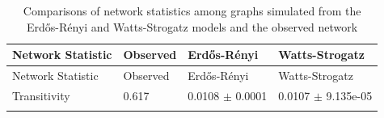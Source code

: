 \documentclass[12pt,twoside]{amherstthesis}
\begin{document}
  \begin{longtable}[]{@{}llll@{}}
  \caption{Comparisons of network statistics among graphs simulated from
  the Erdős-Rényi and Watts-Strogatz models and the observed network
  \label{tab:erwsdescstats}}\tabularnewline
  \toprule
  \begin{minipage}[b]{0.27\columnwidth}\raggedright\strut
  Network Statistic\strut
  \end{minipage} & \begin{minipage}[b]{0.11\columnwidth}\raggedright\strut
  Observed\strut
  \end{minipage} & \begin{minipage}[b]{0.25\columnwidth}\raggedright\strut
  Erdős-Rényi\strut
  \end{minipage} & \begin{minipage}[b]{0.25\columnwidth}\raggedright\strut
  Watts-Strogatz\strut
  \end{minipage}\tabularnewline
  \midrule
  \endfirsthead
  \toprule
  \begin{minipage}[b]{0.27\columnwidth}\raggedright\strut
  Network Statistic\strut
  \end{minipage} & \begin{minipage}[b]{0.11\columnwidth}\raggedright\strut
  Observed\strut
  \end{minipage} & \begin{minipage}[b]{0.25\columnwidth}\raggedright\strut
  Erdős-Rényi\strut
  \end{minipage} & \begin{minipage}[b]{0.25\columnwidth}\raggedright\strut
  Watts-Strogatz\strut
  \end{minipage}\tabularnewline
  \midrule
  \endhead
  \begin{minipage}[t]{0.27\columnwidth}\raggedright\strut
  Transitivity\strut
  \end{minipage} & \begin{minipage}[t]{0.11\columnwidth}\raggedright\strut
  0.617\strut
  \end{minipage} & \begin{minipage}[t]{0.25\columnwidth}\raggedright\strut
  0.0108 \(\pm\) 0.0001\strut
  \end{minipage} & \begin{minipage}[t]{0.25\columnwidth}\raggedright\strut
  0.0107 \(\pm\) 9.135e-05\strut
  \end{minipage}\tabularnewline
  \begin{minipage}[t]{0.27\columnwidth}\raggedright\strut

\end{minipage}
\end{longtable}
\end{document}
